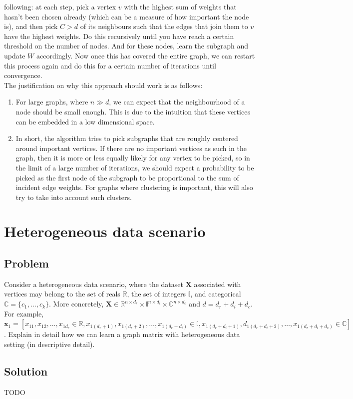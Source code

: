 \documentclass[a4paper]{article}
\newcommand{\nl}{\vspace{0.2cm}\\}
\newcommand{\mf}{\mathbf}
\newcommand{\mb}{\mathbb}
\newcommand{\R}{\mathbb{R}}
\begin{document}
following: at each step, pick a vertex $v$ with the highest sum of weights that hasn't been chosen already (which can be a measure of how important the node is), and then pick $C > d$ of its neighbours such that the edges that join
them to $v$ have the highest weights. Do this recursively until you have reach a certain threshold on the number of nodes. And for these nodes, learn the subgraph and update $W$ accordingly. Now
once this has covered the entire graph, we can restart this process again and do this for a certain number of iterations until convergence.\nl
The justification on why this approach should work is as follows:
\begin{enumerate}
    \item For large graphs, where $n \gg d$, we can expect that the neighbourhood of a node should be small enough. This is due to the intuition that these vertices can be embedded in a low
        dimensional space.
    \item In short, the algorithm tries to pick subgraphs that are roughly centered around important vertices. If there are no important vertices as such in the graph, then it is more or less equally
        likely for any vertex to be picked, so in the limit of a large number of iterations, we should expect a probability to be picked as the first node of the subgraph to be proportional
        to the sum of incident edge weights. For graphs where clustering is important, this will also try to take into account such clusters.
\end{enumerate}


\newpage

\section{Heterogeneous data scenario}

\subsection{Problem}

Consider a heterogeneous data scenario, where the dataset $\mf{X}$ associated with vertices may belong to the set of reals $\R$, the set of integers $\mb{I}$, and categorical $\mb{C} = \{c_1,
\ldots, c_k\}$. More concretely, $\mf{X} \in \R^{n \times d_r} \times \mb{I}^{n \times d_i} \times \mb{C}^{n \times d_c}$ and $d = d_r + d_i + d_c$. For example, $\mf{x}_1 = [x_{11}, x_{12},
\ldots, x_{1d_r} \in \R, x_{1(d_r + 1)}, x_{1(d_r + 2)}, \ldots, x_{1(d_r + d_i)} \in \mb{I}, x_{1(d_r + d_i + 1)}, d_{1(d_r + d_i + 2)}, \ldots, x_{1(d_r + d_i + d_c)} \in \mb{C}]$. Explain in
detail how we can learn a graph matrix with heterogeneous data setting (in descriptive detail).

\subsection{Solution}

TODO
\end{document}
